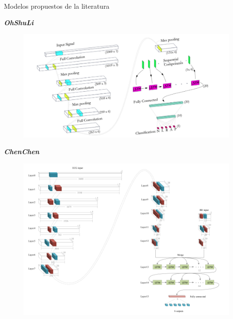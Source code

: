 \begin{frame}{Modelos propuestos de la literatura}
    \begin{overprint}
        
            \begin{center}
                {\color{TurkishRose} \textbf{\textit{OhShuLi}}}
            \end{center}
            \begin{figure}
                \centering
                \vspace{-1cm}
                \includegraphics[keepaspectratio=true,height=0.9\paperheight,width=0.95\paperwidth]{Images/ohshuli1.png}
            \end{figure}
            
            \begin{center}
                {\color{TurkishRose} \textbf{\textit{ChenChen}}}
            \end{center}
            \begin{figure}
                \centering
                \vspace{-0.3cm}
                \includegraphics[keepaspectratio=true,height=0.65\paperheight,width=0.8\paperwidth]{Images/chenchen1.png}
            \end{figure}
        

\end{overprint}
\end{frame}
